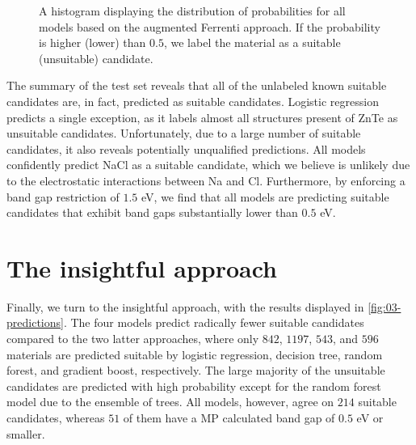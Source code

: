 \begin{figure}[ht!]
    \centering
    
    \vspace*{-130mm}
    \caption{A histogram displaying the distribution of probabilities for all models based on the augmented Ferrenti approach. If the probability is higher (lower) than $0.5$, we label the material as a suitable (unsuitable) candidate.}
    \label{fig:histogram-augmented-ferrenti}
\end{figure}

The summary of the test set reveals that all of the unlabeled known suitable candidates are, in fact, predicted as suitable candidates. Logistic regression predicts a single exception, as it labels almost all structures present of ZnTe as unsuitable candidates. Unfortunately, due to a large number of suitable candidates, it also reveals potentially unqualified predictions. All models confidently predict NaCl as a suitable candidate, which we believe is unlikely due to the electrostatic interactions between Na and Cl. Furthermore, by enforcing a band gap restriction of $1.5$ eV, we find that all models are predicting suitable candidates that exhibit band gaps substantially lower than $0.5$ eV.



\section{The insightful approach}

Finally, we turn to the insightful approach, with the results displayed in \autoref{fig:03-predictions}. The four models predict radically fewer suitable candidates compared to the two latter approaches, where only $842$, $1197$, $543$, and $596$ materials are predicted suitable by logistic regression, decision tree, random forest, and gradient boost, respectively. The large majority of the unsuitable candidates are predicted with high probability except for the random forest model due to the ensemble of trees. All models, however, agree on $214$ suitable candidates, whereas $51$ of them have a MP calculated band gap of $0.5$ eV or smaller.


